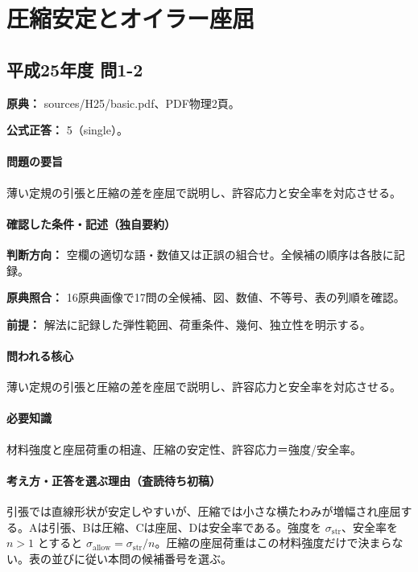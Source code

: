\section{圧縮安定とオイラー座屈}

\subsection{平成25年度 問1-2}
\label{q:h25-reg-basic-1-2}

\noindent\textbf{原典：} sources/H25/basic.pdf、PDF物理2頁。

\textbf{公式正答：} 5（single）。

\paragraph{問題の要旨} 薄い定規の引張と圧縮の差を座屈で説明し、許容応力と安全率を対応させる。

\paragraph{確認した条件・記述（独自要約）}\mbox{}\par

\noindent\textbf{判断方向：} 空欄の適切な語・数値又は正誤の組合せ。全候補の順序は各肢に記録。\par

\noindent\textbf{原典照合：} 16原典画像で17問の全候補、図、数値、不等号、表の列順を確認。\par

\noindent\textbf{前提：} 解法に記録した弾性範囲、荷重条件、幾何、独立性を明示する。\par

\paragraph{問われる核心} 薄い定規の引張と圧縮の差を座屈で説明し、許容応力と安全率を対応させる。

\paragraph{必要知識} 材料強度と座屈荷重の相違、圧縮の安定性、許容応力＝強度/安全率。

\paragraph{考え方・正答を選ぶ理由（査読待ち初稿）} 引張では直線形状が安定しやすいが、圧縮では小さな横たわみが増幅され座屈する。Aは引張、Bは圧縮、Cは座屈、Dは安全率である。強度を \(\sigma_{\mathrm{str}}\)、安全率を \(n>1\) とすると \(\sigma_{\mathrm{allow}}=\sigma_{\mathrm{str}}/n\)。圧縮の座屈荷重はこの材料強度だけで決まらない。表の並びに従い本問の候補番号を選ぶ。

